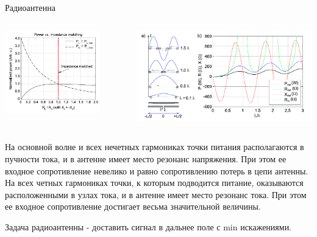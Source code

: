 \documentclass[9pt, compress, xcolor=table]{beamer}
\begin{document}
\begin{frame}{Радиоантенна}
\begin{columns}[c]
\column{6.3cm}
\begin{center}
\includegraphics[width=0.8\textwidth]{optant53}
\end{center}
\column{6.3cm}
\begin{center}
\includegraphics[width=\textwidth]{optant54}
\end{center}
\end{columns}

{\small На основной волне и всех \textcolor{red!50!black}{нечетных гармониках} точки питания располагаются в пучности тока, и в антенне имеет место резонанс напряжения. При этом ее входное сопротивление невелико и равно сопротивлению потерь в цепи антенны. На всех \textcolor{red!50!black}{четных гармониках} точки, к которым подводится питание, оказываются расположенными в узлах тока, и в антенне имеет место резонанс тока. При этом ее входное сопротивление достигает весьма значительной величины.

$\boxed{\text{Задача радиоантенны - доставить сигнал в дальнее поле с min искажениями.}}$}
\end{frame}
\end{document}
